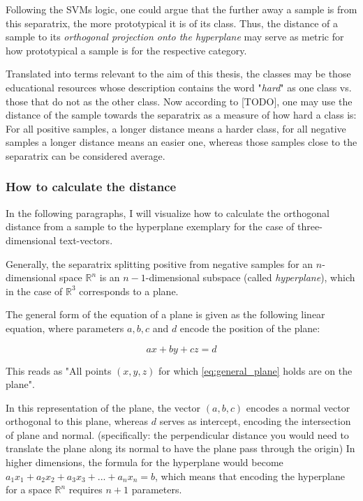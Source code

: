 Following the SVMs logic, one could argue that the further away a sample is from this separatrix, the more prototypical it is of its class. Thus, the distance of a sample to its \textit{orthogonal projection onto the hyperplane} %
may serve as metric for how prototypical a sample is for the respective category. 

Translated into terms relevant to the aim of this thesis, the classes may be those educational resources whose description contains the word "\textit{hard}" as one class vs. those that do not as the other class. Now according to [TODO], one may use the distance of the sample towards the separatrix as a measure of how hard a class is: For all positive samples, a longer distance means a harder class, for all negative samples a longer distance means an easier one, whereas those samples close to the separatrix can be considered average.

\subsubsection*{How to calculate the distance}

\noindent In the following paragraphs, I will visualize how to calculate the orthogonal distance from a sample to the hyperplane exemplary for the case of three-dimensional text-vectors.

Generally, the separatrix splitting positive from negative samples for an $n$-dimensional space $\mathds{R}^n$ is an $n-1$-dimensional subspace (called \textit{hyperplane}), which in the case of $\mathds{R}^3$ corresponds to a plane. 

The general form of the equation of a plane is given as the following linear equation, where parameters $a, b, c$ and $d$ encode the position of the plane:

\begin{equation}
	\label{eq:general_plane}
	ax + by + cz = d
\end{equation}

This reads as "All points $(x,y,z)$ for which \ref{eq:general_plane} holds are on the plane". 

In this representation of the plane, the vector $(a,b,c)$ encodes a normal vector orthogonal to this plane, whereas $d$ serves as intercept, encoding the intersection of plane and normal. (specifically: the perpendicular distance you would need to translate the plane along its normal to have the plane pass through the origin) In higher dimensions, the formula for the hyperplane would become $a_1x_1+a_2x_2+a_3x_3+...+a_nx_n = b$, which means that encoding the hyperplane for a space $\mathds{R}^n$ requires $n+1$ parameters.

